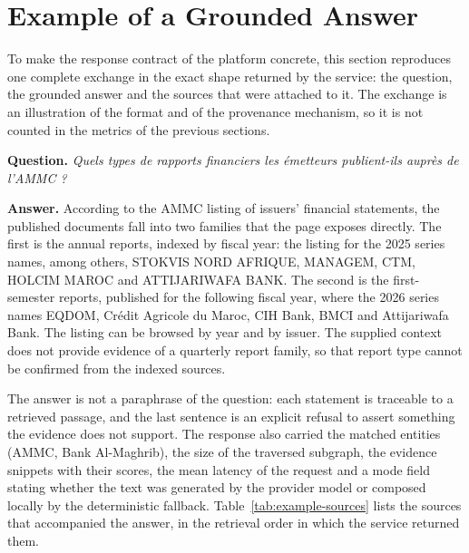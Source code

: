 \section{Example of a Grounded Answer}
\label{sec:example-answer}
To make the response contract of the platform concrete, this section reproduces one complete exchange in the exact shape returned by the service: the question, the grounded answer and the sources that were attached to it. The exchange is an illustration of the format and of the provenance mechanism, so it is not counted in the metrics of the previous sections.

\begin{infobox}
\textbf{Question.} \emph{Quels types de rapports financiers les émetteurs publient-ils auprès de l'AMMC ?}
\end{infobox}

\begin{successbox}
\textbf{Answer.} According to the AMMC listing of issuers' financial statements, the published documents fall into two families that the page exposes directly. The first is the annual reports, indexed by fiscal year: the listing for the 2025 series names, among others, STOKVIS NORD AFRIQUE, MANAGEM, CTM, HOLCIM MAROC and ATTIJARIWAFA BANK. The second is the first-semester reports, published for the following fiscal year, where the 2026 series names EQDOM, Cr\'edit Agricole du Maroc, CIH Bank, BMCI and Attijariwafa Bank. The listing can be browsed by year and by issuer. The supplied context does not provide evidence of a quarterly report family, so that report type cannot be confirmed from the indexed sources.
\end{successbox}

The answer is not a paraphrase of the question: each statement is traceable to a retrieved passage, and the last sentence is an explicit refusal to assert something the evidence does not support. The response also carried the matched entities (AMMC, Bank Al-Maghrib), the size of the traversed subgraph, the evidence snippets with their scores, the mean latency of the request and a mode field stating whether the text was generated by the provider model or composed locally by the deterministic fallback. Table~\ref{tab:example-sources} lists the sources that accompanied the answer, in the retrieval order in which the service returned them.

